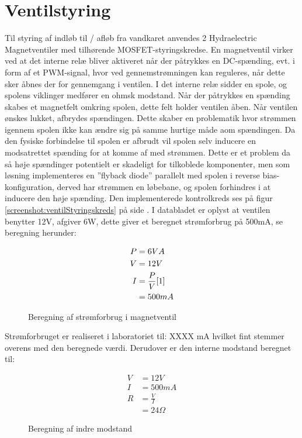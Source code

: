 \section{Ventilstyring}
Til styring af indløb til / afløb fra vandkaret anvendes 2 Hydraelectric Magnetventiler med tilhørende MOSFET-styringskredse. En magnetventil virker ved at det interne relæ bliver aktiveret når der påtrykkes en DC-spænding, evt. i form af et PWM-signal, hvor ved gennemstrømningen kan reguleres, når dette sker åbnes der for gennemgang i ventilen. I det interne relæ sidder en spole, og spolens viklinger medfører en ohmsk modstand. Når der påtrykkes en spænding skabes et magnetfelt omkring spolen, dette felt holder ventilen åben. Når ventilen ønskes lukket, afbrydes spændingen. Dette skaber en problematik hvor strømmen igennem spolen ikke kan ændre sig på samme hurtige måde aom spændingen. Da den fysiske forbindelse til spolen er afbrudt vil spolen selv inducere en modsatrettet spænding for at komme af med strømmen. Dette er et problem da så høje spændinger potentielt er skadeligt for tilkoblede komponenter, men som løsning implementeres en ”flyback diode” parallelt med spolen i reverse bias-konfiguration, derved har strømmen en løbebane, og spolen forhindres i at inducere den høje spænding. Den implementerede kontrolkreds ses på figur \ref{screenshot:ventilStyringskreds} på side \pageref{screenshot:ventilStyringskreds}.
I databladet er oplyst at ventilen benytter 12V, afgiver 6W, dette giver et beregnet strømforbrug på 500mA, se beregning herunder:

\begin{figure}[!h]
		\begin{align*}
			P &= 6 VA \\ 
			V &= 12 V \\
			I &= \frac{P}{V} \eqref{1}\\ 
			&= 500mA
		\end{align*}
\label{eq:ventilA}
\caption{Beregning af strømforbrug i magnetventil}
\end{figure}

Strømforbruget er realiseret i laboratoriet til: XXXX mA hvilket fint stemmer overens med den beregnede værdi. Derudover er den interne modstand beregnet til: 

\begin{figure}[!h]
	\begin{align*}
		V &= 12 V \\ 
		I &= 500 mA \\
		R &= \frac{V}{I} \\ 
		&= 24 \Omega
	\end{align*}
\caption{Beregning af indre modstand}
\label{eq:ventilOhm}
\end{figure}

